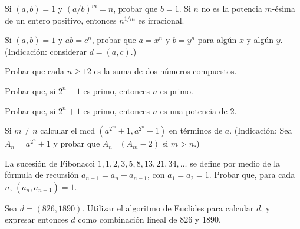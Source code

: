 \documentclass[12pt,a4paper]{book}
\begin{document}
    \begin{ejercicio}
        Si $(a,b)=1$ y $(a/b)^m=n$, probar que $b=1$. Si $n$ no es la potencia $m$-ésima de
        un entero positivo, entonces $n^{1/m}$ es irracional.
    \end{ejercicio}

    \begin{ejercicio}
        Si $(a,b)=1$ y $ab=c^n$, probar que $a=x^n$ y $b=y^n$ para algún $x$ y algún $y$.
        (Indicación: considerar $d=(a,c)$.)
    \end{ejercicio}

    \begin{ejercicio}
        Probar que cada $n\geq12$ es la suma de dos números compuestos.
    \end{ejercicio}

    \begin{ejercicio}
        Probar que, si $2^n-1$ es primo, entonces $n$ es primo.
    \end{ejercicio}

    \begin{ejercicio}
        Probar que, si $2^n+1$ es primo, entonces $n$ es una potencia de 2.
    \end{ejercicio}

    \begin{ejercicio}
        Si $m\neq n$ calcular el mcd $(a^{2^m}+1,a^{2^n}+1)$ en términos de $a$.
        (Indicación: Sea $A_n=a^{2^n}+1$ y probar que $A_n\mid(A_m-2)$ si $m>n$.)
    \end{ejercicio}

    \begin{ejercicio}
        La sucesión de Fibonacci $1,1,2,3,5,8,13,21,34,\dots$ se define por medio de la
        fórmula de recursión $a_{n+1}=a_n+a_{n-1}$, con $a_1=a_2=1$. Probar que, para cada
        $n$, $(a_n,a_{n+1})=1$.
    \end{ejercicio}

    \begin{ejercicio}
        Sea $d=(826,1890)$. Utilizar el algoritmo de Euclides para calcular $d$, y expresar
        entonces $d$ como combinación lineal de 826 y 1890.
    \end{ejercicio}
\end{document}
